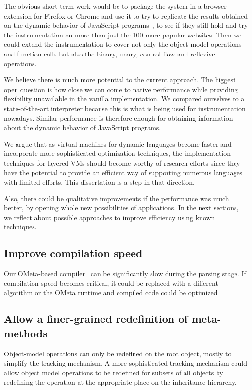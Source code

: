The obvious short term work would be to package the system in a browser
extension for Firefox or Chrome and use it to try to replicate the results
obtained on the dynamic behavior of JavaScript programs~\cite{behavior_js}, to
see if they still hold and try the instrumentation on more than just the 100
more popular websites. Then we could extend the instrumentation to cover not
only the object model operations and function calls but also the binary, unary,
control-flow and reflexive operations.

We believe there is much more potential to the current approach. The
biggest open question is how close we can come to native performance while
providing flexibility unavailable in the vanilla implementation. We compared
ourselves to a state-of-the-art interpreter because this is what is being used
for instrumentation nowadays. Similar performance is therefore enough for
obtaining information about the dynamic behavior of JavaScript programs. 

We argue that as virtual machines for dynamic languages become faster and
incorporate more sophisticated optimization techniques, the implementation
techniques for layered VMs should become worthy of research efforts since they
have the potential to provide an efficient way of supporting numerous languages
with limited efforts. This dissertation is a step in that direction.

Also, there could be qualitative improvements if the performance was much
better, by opening whole new possibilities of applications.  In the next
sections, we reflect about possible approaches to improve efficiency
using known techniques.

\subsection{Improve compilation speed}

Our OMeta-based compiler~\cite{Warth:2007} can be significantly slow during the
parsing stage. If compilation speed becomes critical, it could be replaced with
a different algorithm or the OMeta runtime and compiled code could be
optimized.

\subsection{Allow a finer-grained redefinition of meta-methods}

Object-model operations can only be redefined on the root object, mostly to
simplify the tracking mechanism. A more sophisticated tracking mechanism could
allow object model operations to be redefined for subsets of all objects by
redefining the operation at the appropriate place on the inheritance hierarchy.

